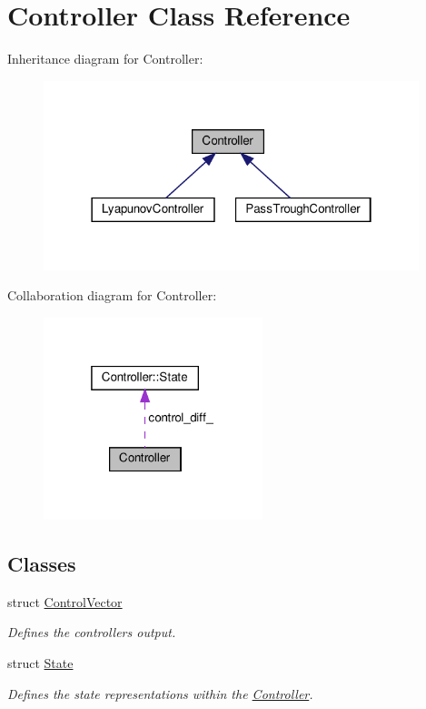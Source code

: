 \hypertarget{classController}{}\section{Controller Class Reference}
\label{classController}


Inheritance diagram for Controller\+:\nopagebreak
\begin{figure}[H]
\begin{center}
\leavevmode
\includegraphics[width=310pt]{dc/d30/classController__inherit__graph}
\end{center}
\end{figure}


Collaboration diagram for Controller\+:
\nopagebreak
\begin{figure}[H]
\begin{center}
\leavevmode
\includegraphics[width=181pt]{dd/d93/classController__coll__graph}
\end{center}
\end{figure}
\subsection*{Classes}
\begin{DoxyCompactItemize}
\item 
struct \hyperlink{structController_1_1ControlVector}{Control\+Vector}
\begin{DoxyCompactList}\small\item\em Defines the controllers output. \end{DoxyCompactList}\item 
struct \hyperlink{structController_1_1State}{State}
\begin{DoxyCompactList}\small\item\em Defines the state representations within the \hyperlink{classController}{Controller}. \end{DoxyCompactList}\end{DoxyCompactItemize}
